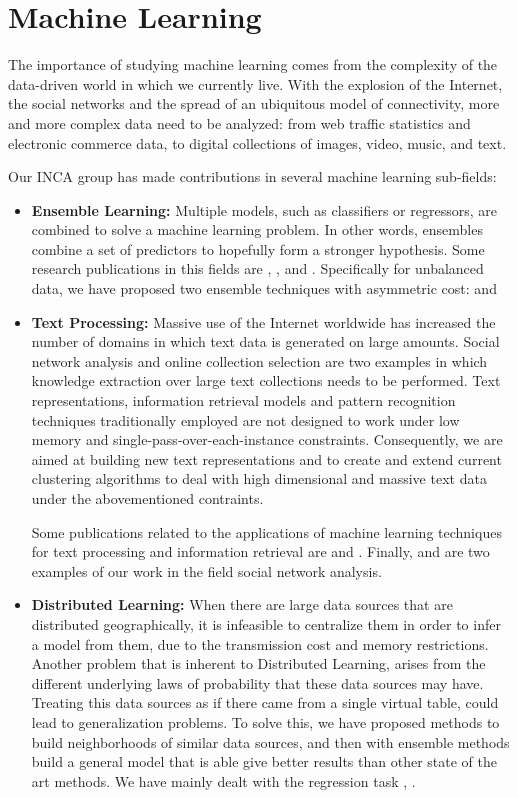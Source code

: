 \section{Machine Learning}

The importance of studying machine learning comes from the complexity of
the data-driven world in which we currently live. With the explosion of
the Internet, the social networks and the spread of an ubiquitous model of
connectivity, more and more complex data need to be analyzed: from web
traffic statistics and electronic commerce data, to digital collections of
images, video, music, and text.

Our INCA group has made contributions in several machine learning
sub-fields:
\begin{itemize}
\item \textbf{Ensemble Learning:} Multiple models, such as classifiers or
regressors, are combined to solve a machine learning problem. In other
words, ensembles combine a set of predictors to hopefully form a stronger
hypothesis.
Some research publications in this fields are \cite{NanculefVAM06},
\cite{ValleSAMF10}, \cite{FernandezVSA12} and \cite{NanculefVAM12}.
Specifically for unbalanced data, we have proposed two ensemble techniques with
asymmetric cost: \cite{NanculefVAM07} and \cite{OrmenoRVAA12}
\item \textbf{Text Processing:} Massive use of the Internet worldwide has
increased the number of domains in which text data is generated on large
amounts. Social network analysis and online collection selection are two
examples in which knowledge extraction over large text collections needs
to be performed. Text representations, information retrieval models and
pattern recognition techniques traditionally employed are not designed to
work under low memory and single-pass-over-each-instance constraints.
Consequently, we are aimed at building new text representations and to
create and extend current clustering algorithms to deal with high
dimensional and massive text data under the abovementioned contraints.

Some publications related to the applications of machine learning
techniques for text processing and information retrieval are \cite{ZMA14}
and \cite{MZ09}. Finally, \cite{ZGDAVS13} and \cite{CSHZ12} are two
examples of our work in the field social network analysis.

\item \textbf{Distributed Learning:}
When there are large data sources that are distributed geographically, it
is infeasible to centralize them in order to infer a model from them, due
to the transmission cost and memory restrictions. Another problem that is
inherent to Distributed Learning, arises from the different underlying
laws of probability that these data sources may have. Treating this data
sources as if there came from a single virtual table, could lead to
generalization problems. To solve this, we have proposed methods to build
neighborhoods of similar data sources, and then with ensemble methods
build a general model that is able give better results than other state of
the art methods. We have mainly dealt with the regression task
\cite{Allende13}, \cite{Allende14}. 

\end{itemize}
